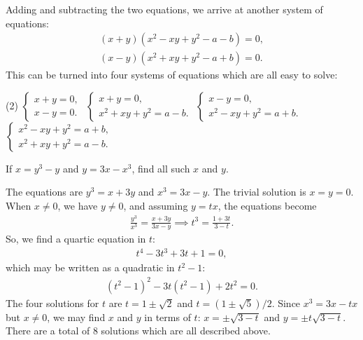 \begin{solution}
    Adding and subtracting the two equations, we arrive at another system of equations:
    \begin{align*}
        (x+y)(x^2-xy+y^2-a-b)=0,\\ (x-y)(x^2+xy+y^2-a+b)=0.
    \end{align*}
    This can be turned into four systems of equations which are all easy to solve:
    \begin{tasks}(2)
        \task $\begin{cases}
            x+y=0,\\x-y=0.
        \end{cases}$
        \task $\begin{cases}
            x+y=0,\\ x^2+xy+y^2=a-b.
        \end{cases}$
        \task $\begin{cases}
            x-y=0,\\ x^2 - xy + y^2 = a+b.
        \end{cases}$
        \task $\begin{cases}
            x^2-xy+y^2 = a+b,\\ x^2+xy+y^2 = a-b.
        \end{cases}$
    \end{tasks}
\end{solution}

\begin{question}
    If $x=y^3-y$ and $y=3x-x^3$, find all such $x$ and $y$.
\end{question}

\begin{solution}
    The equations are $y^3=x+3y$ and $x^3=3x-y$. The trivial solution is $x=y=0$. When $x\neq 0$, we have $y\neq 0$, and assuming $y=tx$, the equations become
    \begin{align*}
        \frac{y^3}{x^3}= \frac{x+3y}{3x-y} \implies t^3 = \frac{1+3t}{3-t}.
    \end{align*}
    So, we find a quartic equation in $t$:
    \begin{align*}
        t^4-3t^3+3t+1=0,
    \end{align*}
    which may be written as a quadratic in $t^2-1$:
    \begin{align*}
        (t^2-1)^2 -3t(t^2-1) + 2t^2 = 0.
    \end{align*}
    The four solutions for $t$ are $t=1\pm \sqrt{2}$ and $t=(1\pm\sqrt{5})/2$. Since $x^3=3x-tx$ but $x\neq 0$, we may find $x$ and $y$ in terms of $t$: $x=\pm\sqrt{3-t}$ and $y=\pm t\sqrt{3-t}$. There are a total of $8$ solutions which are all described above.
\end{solution}



